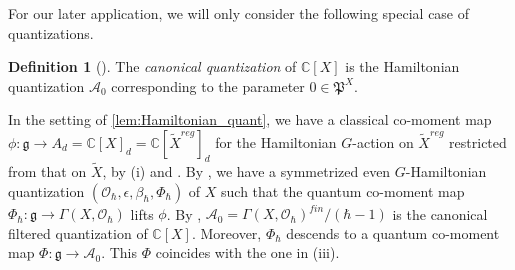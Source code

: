 \documentclass[11pt, a4paper]{amsart}
\newcommand{\C}{\mathbb{C}}
\newcommand{\g}{\mathfrak{g}}
\newcommand{\fg}{\mathfrak{g}}
\newcommand{\fP}{\mathfrak{P}}
\newcommand{\cA}{\mathcal{A}}
\newcommand{\cU}{\mathcal{U}}
\newcommand{\Ug}{\cU\fg}
\newcommand{\hb}{\hbar}
\newcommand{\OO}{\mathcal{O}}
\theoremstyle{definition}
\newtheorem{defi}[Thm]{Definition}
\numberwithin{equation}{section}
\begin{document}
For our later application, we will only consider the following special case of quantizations.

\begin{defi}[{\cite[Definition 5.0.1]{LMBM}}]\label{defn:can_quant}
	The \emph{canonical quantization} of $\C[X]$ is the Hamiltonian quantization $\cA_0$ corresponding to the parameter $0 \in \fP^X$. 
\end{defi}


In the setting of \cref{lem:Hamiltonian_quant}, we have a classical co-moment map $\phi: \fg \to A_d = \C[X]_d = \C[\widetilde{X}^{reg}]_d$ for the Hamiltonian $G$-action on $\widetilde{X}^{reg}$ restricted from that on $\widetilde{X}$, by  (i) and . By , we have a symmetrized even $G$-Hamiltonian quantization $(\OO_\hb, \epsilon, \beta_\hb, \Phi_\hb)$ of $X$ such that the quantum co-moment map $\Phi_\hb: \g \to \Gamma(X, \OO_\hb)$ lifts $\phi$. By , $\cA_0 = \Gamma(X, \OO_\hb)^{fin}/(\hb-1)$ is the canonical filtered quantization of $\C[X]$. Moreover, $\Phi_\hb$ descends to a quantum co-moment map $\Phi: \g \to \cA_0$. This $\Phi$ coincides with the one in  (iii). 
\end{document}
